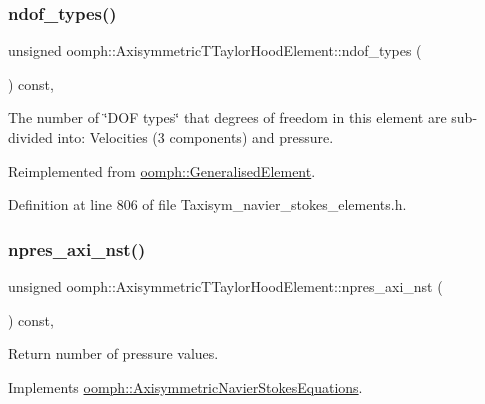 \subsubsection{\texorpdfstring{ndof\+\_\+types()}{ndof\_types()}}
{\footnotesize\ttfamily unsigned oomph\+::\+Axisymmetric\+T\+Taylor\+Hood\+Element\+::ndof\+\_\+types (\begin{DoxyParamCaption}{ }\end{DoxyParamCaption}) const\hspace{0.3cm}{\ttfamily [inline]}, {\ttfamily [virtual]}}



The number of \char`\"{}\+D\+O\+F types\char`\"{} that degrees of freedom in this element are sub-\/divided into\+: Velocities (3 components) and pressure. 



Reimplemented from \hyperlink{classoomph_1_1GeneralisedElement_a0c6037a870597b35dcf1c780710b9a56}{oomph\+::\+Generalised\+Element}.



Definition at line 806 of file Taxisym\+\_\+navier\+\_\+stokes\+\_\+elements.\+h.

\mbox{\label{classoomph_1_1AxisymmetricTTaylorHoodElement_a39217f9f550c3488f8f660ae861a61a7}} 
\subsubsection{\texorpdfstring{npres\+\_\+axi\+\_\+nst()}{npres\_axi\_nst()}}
{\footnotesize\ttfamily unsigned oomph\+::\+Axisymmetric\+T\+Taylor\+Hood\+Element\+::npres\+\_\+axi\+\_\+nst (\begin{DoxyParamCaption}{ }\end{DoxyParamCaption}) const\hspace{0.3cm}{\ttfamily [inline]}, {\ttfamily [virtual]}}



Return number of pressure values. 



Implements \hyperlink{classoomph_1_1AxisymmetricNavierStokesEquations_a89edaffb4913131cc14a5f6e45ed117a}{oomph\+::\+Axisymmetric\+Navier\+Stokes\+Equations}.



